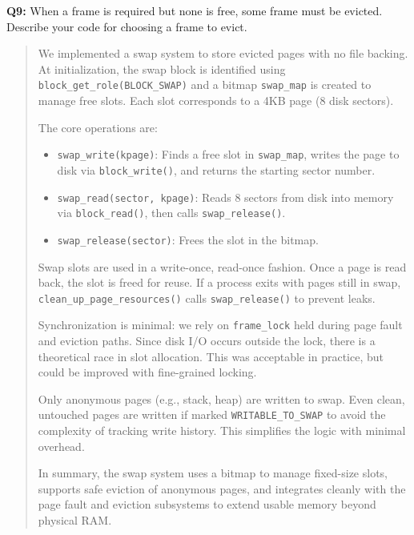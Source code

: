 \documentclass[a4paper,11pt]{paper}
\begin{document}
\textbf{Q9:} When a frame is required but none is free, some frame must be evicted.  Describe your code for choosing a frame to evict.
\begin{quote}
  We implemented a swap system to store evicted pages with no file backing. At initialization, the swap block is identified using \texttt{block\_get\_role(BLOCK\_SWAP)} and a bitmap \texttt{swap\_map} is created to manage free slots. Each slot corresponds to a 4KB page (8 disk sectors).

The core operations are:
\begin{itemize}
  \item \texttt{swap\_write(kpage)}: Finds a free slot in \texttt{swap\_map}, writes the page to disk via \texttt{block\_write()}, and returns the starting sector number.
  \item \texttt{swap\_read(sector, kpage)}: Reads 8 sectors from disk into memory via \texttt{block\_read()}, then calls \texttt{swap\_release()}.
  \item \texttt{swap\_release(sector)}: Frees the slot in the bitmap.
\end{itemize}

Swap slots are used in a write-once, read-once fashion. Once a page is read back, the slot is freed for reuse. If a process exits with pages still in swap, \texttt{clean\_up\_page\_resources()} calls \texttt{swap\_release()} to prevent leaks.

Synchronization is minimal: we rely on \texttt{frame\_lock} held during page fault and eviction paths. Since disk I/O occurs outside the lock, there is a theoretical race in slot allocation. This was acceptable in practice, but could be improved with fine-grained locking.

Only anonymous pages (e.g., stack, heap) are written to swap. Even clean, untouched pages are written if marked \texttt{WRITABLE\_TO\_SWAP} to avoid the complexity of tracking write history. This simplifies the logic with minimal overhead.

In summary, the swap system uses a bitmap to manage fixed-size slots, supports safe eviction of anonymous pages, and integrates cleanly with the page fault and eviction subsystems to extend usable memory beyond physical RAM.

\end{quote}
\end{document}
